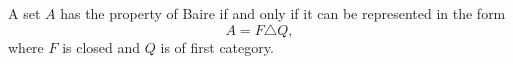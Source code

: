 A set $A$ has the property of Baire if and only if it can be represented in the form
$$A = F \triangle Q,$$
where $F$ is closed and $Q$ is of first category.
